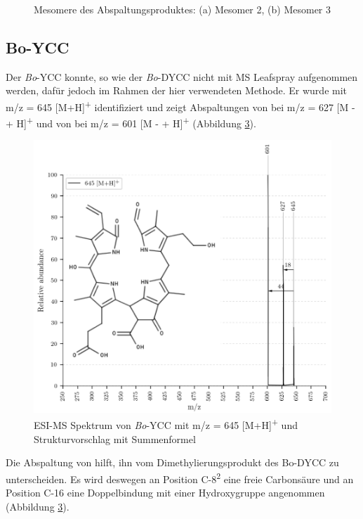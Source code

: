 \begin{figure}[!htbp]
\begin{subfigure}[b]{0.5\textwidth}
    \caption{}
    \label{fig:311MHMesomer3}
  \end{subfigure}
  \caption[2 Mesomere für potentielle Abspaltungsprodukte von \textit{Bo}-DNCC, Quelle: Autor]{Mesomere des Abspaltungsproduktes: (a) Mesomer 2, (b) Mesomer 3}
\end{figure}

\pagebreak
\subsection{Bo-YCC}

Der \textit{Bo}-YCC konnte, so wie der \textit{Bo}-DYCC nicht mit MS Leafspray aufgenommen werden, dafür jedoch im Rahmen der hier verwendeten Methode. Er wurde mit m/z = 645 [M+H]\textsuperscript{+} identifiziert und zeigt Abspaltungen von  bei m/z = 627 [M -  + H]\textsuperscript{+} und von  bei m/z = 601 [M -  + H]\textsuperscript{+} (Abbildung \ref{fig:645MH}). 

\begin{figure}[!htbp]
  \centering
  \includegraphics[width=\textwidth, height=0.8\textwidth]{figures/Kapitel7/Kataboliten/VWA_MS_645-12.png}
  \caption[ESI-MS Spektrum von \textit{Bo}-YCC, Quelle: Autor]{ESI-MS Spektrum von \textit{Bo}-YCC mit m/z = 645 [M+H]\textsuperscript{+} und Strukturvorschlag mit Summenformel }
  \label{fig:645MH}
\end{figure}

Die Abspaltung von  hilft, ihn vom Dimethylierungsprodukt des Bo-DYCC zu unterscheiden. Es wird deswegen an Position C-8\textsuperscript{2} eine freie Carbonsäure und an Position C-16 eine Doppelbindung mit einer Hydroxygruppe angenommen (Abbildung \ref{fig:645MH}).




